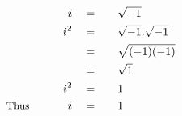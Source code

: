 \begin{alignat*}{5}
&\,&i\quad&=\quad&&\sqrt{-1}\\
&\,&i^2\quad&=&&\sqrt{-1}.\sqrt{-1}\\
&\,&\,&=&&\sqrt{(-1)(-1)}\\
&\,&\,&=&&\sqrt{1}\\
&\,&i^2\quad&=&&1\\
&\small\text{Thus}\normalsize\qquad&i\quad&=&&1
\end{alignat*}
